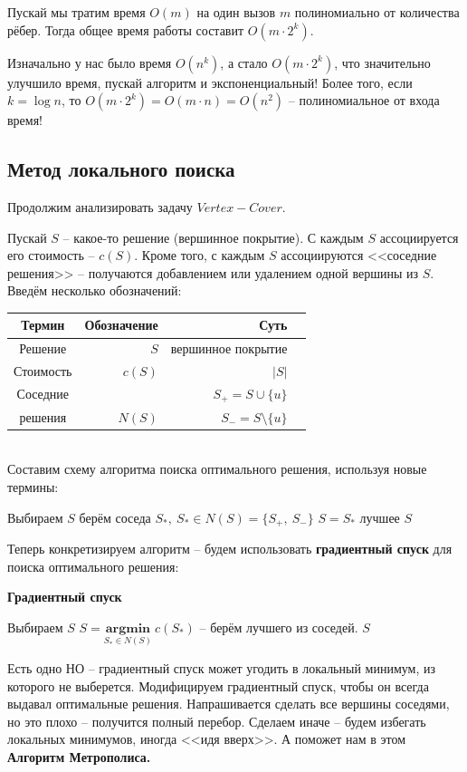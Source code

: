 \documentclass[a4paper,12pt]{article}
\begin{document}
Пускай мы тратим время $O(m)$ на один вызов $m$ полиномиально от количества рёбер. Тогда общее время работы составит $O(m\cdot 2^k)$.

Изначально у нас было время $O(n^k)$, а стало $O(m\cdot 2^k)$, что значительно улучшило время, пускай алгоритм и экспоненциальный! Более того, если $k = \log n$, то $O(m\cdot 2^k) = O(m\cdot n) = O(n^2)$ -- полиномиальное от входа время!

\subsection{Метод локального поиска}

Продолжим анализировать задачу $Vertex-Cover$.

Пускай $S$ -- какое-то решение (вершинное покрытие). С каждым $S$ ассоциируется его стоимость -- $c(S)$. Кроме того, с каждым $S$ ассоциируются <<соседние решения>> -- получаются добавлением или удалением одной вершины из $S$. Введём несколько обозначений:
\\
\begin{tabular}{|c|*{3}{r|}|}
    \hline
    Термин& Обозначение & Суть \\
    \hline
    Решение & $S$ & вершинное покрытие\\
    \hline
    Стоимость & $c(S)$ & $|S|$\\
    \hline
    Соседние &  & $S_+ = S \cup \{u\}$\\
    решения& $N(S)$& $S_- = S \setminus \{u\}$\\
    \hline
\end{tabular}
\\ 

Составим схему алгоритма поиска оптимального решения, используя новые термины:
\begin{algorithmic}
     \State Выбираем $S$
        \State берём соседа $S_*,\ S_* \in N(S) = \{S_+,\ S_-\}$
            \State $S = S_*$
        \EndIf
    \EndWhile
    \State\Return лучшее $S$
\end{algorithmic}
Теперь конкретизируем алгоритм -- будем использовать \textbf{градиентный спуск} для поиска оптимального решения:
\begin{algorithm}[H]
        \caption{\textbf{Градиентный спуск}}
    \begin{algorithmic}[1]
        \Statex
        \State Выбираем $S$
            \State $S = \underset{S_* \in N(S)}{\textbf{argmin}}\ c(S_*)$ -- берём лучшего из соседей.
        \EndWhile
        \State\Return$S$
    \end{algorithmic}
\end{algorithm}
Есть одно НО -- градиентный спуск может угодить в локальный минимум, из которого не выберется. Модифицируем градиентный спуск, чтобы он всегда выдавал оптимальные решения. Напрашивается сделать все вершины соседями, но это плохо -- получится полный перебор. Сделаем иначе -- будем избегать локальных минимумов, иногда <<идя вверх>>. А поможет нам в этом \textbf{Алгоритм Метрополиса.}
\end{document}
